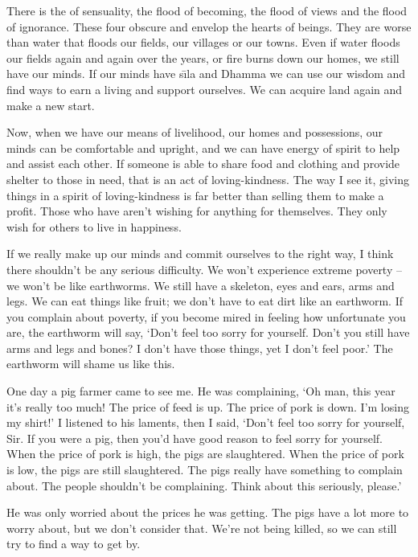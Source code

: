 There is the  of sensuality, the flood of becoming, the flood of views and the flood of ignorance. These four obscure and envelop the hearts of beings. They are worse than water that floods our fields, our villages or our towns. Even if water floods our fields again and again over the years, or fire burns down our homes, we still have our minds. If our minds have s\={\i}la and Dhamma we can use our wisdom and find ways to earn a living and support ourselves. We can acquire land again and make a new start.

Now, when we have our means of livelihood, our homes and possessions, our minds can be comfortable and upright, and we can have energy of spirit to help and assist each other. If someone is able to share food and clothing and provide shelter to those in need, that is an act of loving-kindness. The way I see it, giving things in a spirit of loving-kindness is far better than selling them to make a profit. Those who have  aren't wishing for anything for themselves. They only wish for others to live in happiness.

If we really make up our minds and commit ourselves to the right way, I think there shouldn't be any serious difficulty. We won't experience \mbox{extreme} poverty -- we won't be like earthworms. We still have a skeleton, eyes and ears, arms and legs. We can eat things like fruit; we don't have to eat dirt like an earthworm. If you complain about poverty, if you become mired in feeling how unfortunate you are, the earthworm will say, `Don't feel too sorry for yourself. Don't you still have arms and legs and bones? I don't have those things, yet I don't feel poor.' The earthworm will shame us like this.

One day a pig farmer came to see me. He was complaining, `Oh man, this year it's really too much! The price of feed is up. The price of pork is down. I'm losing my shirt!' I listened to his laments, then I said, `Don't feel too sorry for yourself, Sir. If you were a pig, then you'd have good reason to feel sorry for yourself. When the price of pork is high, the pigs are slaughtered. When the price of pork is low, the pigs are still slaughtered. The pigs really have something to complain about. The people shouldn't be complaining. Think about this seriously, please.'

He was only worried about the prices he was getting. The pigs have a lot more to worry about, but we don't consider that. We're not being killed, so we can still try to find a way to get by.

